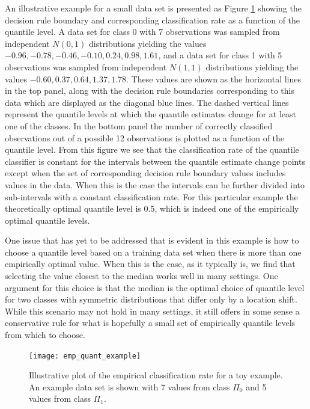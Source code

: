 An illustrative example for a small data set is presented as Figure
\ref{fig:empirical-classification-rate} showing the decision rule boundary and
corresponding classification rate as a function of the quantile level.  A data
set for class 0 with 7 observations was sampled from independent $N(0, 1)$
distributions yielding the values
$-0.96,\allowbreak -0.78,\allowbreak -0.46,\allowbreak -0.10,\allowbreak
0.24,\allowbreak 0.98,\allowbreak 1.61$, and a data set for class 1 with 5
observations was sampled from independent $N(1, 1)$ distributions yielding the
values
$-0.60,\allowbreak 0.37,\allowbreak 0.64,\allowbreak 1.37,\allowbreak 1.78$.
These values are shown as the horizontal lines in the top panel, along with the
decision rule boundaries corresponding to this data which are displayed as the
diagonal blue lines.  The dashed vertical lines represent the quantile levels at
which the quantile estimates change for at least one of the classes.  In the
bottom panel the number of correctly classified observations out of a possible
12 observations is plotted as a function of the quantile level.  From this
figure we see that the classification rate of the quantile classifier is
constant for the intervals between the quantile estimate change points except
when the set of corresponding decision rule boundary values includes values in
the data.  When this is the case the intervals can be further divided into
sub-intervals with a constant classification rate.  For this particular example
the theoretically optimal quantile level is 0.5, which is indeed one of the
empirically optimal quantile levels.

One issue that has yet to be addressed that is evident in this example is how to
choose a quantile level based on a training data set when there is more than one
empirically optimal value.  When this is the case, as it typically is, we find
that selecting the value closest to the median works well in many settings.  One
argument for this choice is that the median is the optimal choice of quantile
level for two classes with symmetric distributions that differ only by a
location shift.  While this scenario may not hold in many settings, it still
offers in some sense a conservative rule for what is hopefully a small set of
empirically quantile levels from which to choose.

\begin{figure}[p]
  \caption[Example empirical classification rate]{Illustrative plot of the
    empirical classification rate for a toy example.  An example data set is
    shown with 7 values from class $\Pi_0$ and 5 values from class $\Pi_1$. }
  \label{fig:empirical-classification-rate}
  \centering
  \vspace{5mm}

  \texttt{[image: emp\_quant\_example]}
\end{figure}


